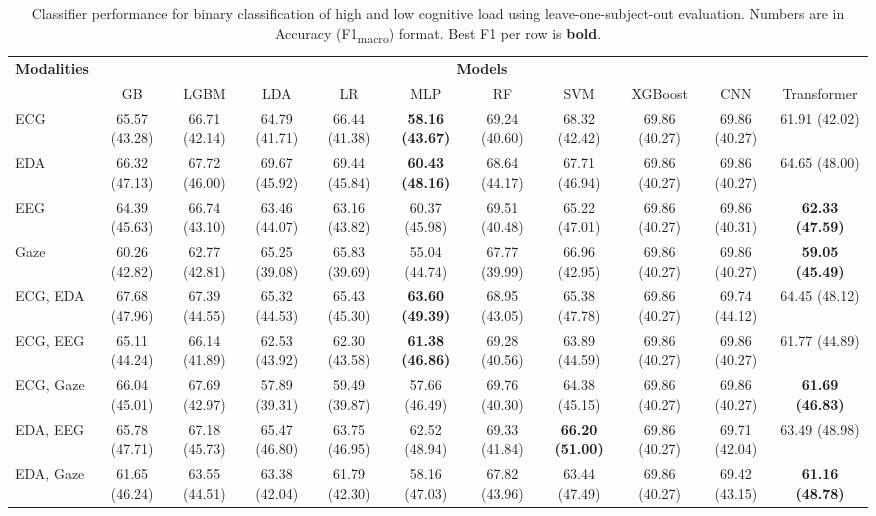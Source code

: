 \begin{table}[!htbp]
  \centering
  \scriptsize
  \setlength{\tabcolsep}{3pt}
  \caption{Classifier performance for binary classification of high and low cognitive load using leave-one-subject-out evaluation. Numbers are in Accuracy (F1\textsubscript{macro}) format. Best F1 per row is \textbf{bold}.}
  \label{tab:results_loso}
  \begin{tabular}{lcccccccccc}
    \toprule
    \textbf{Modalities} & \multicolumn{10}{c}{\textbf{Models}} \\
    \cmidrule(l){2-11}
    & GB & LGBM & LDA & LR & MLP & RF & SVM & XGBoost & CNN & Transformer \\
    \midrule
    ECG & 65.57 (43.28) & 66.71 (42.14) & 64.79 (41.71) & 66.44 (41.38) & \textbf{58.16 (43.67)} & 69.24 (40.60) & 68.32 (42.42) & 69.86 (40.27) & 69.86 (40.27) & 61.91 (42.02) \\
    EDA & 66.32 (47.13) & 67.72 (46.00) & 69.67 (45.92) & 69.44 (45.84) & \textbf{60.43 (48.16)} & 68.64 (44.17) & 67.71 (46.94) & 69.86 (40.27) & 69.86 (40.27) & 64.65 (48.00) \\
    EEG & 64.39 (45.63) & 66.74 (43.10) & 63.46 (44.07) & 63.16 (43.82) & 60.37 (45.98) & 69.51 (40.48) & 65.22 (47.01) & 69.86 (40.27) & 69.86 (40.31) & \textbf{62.33 (47.59)} \\
    Gaze & 60.26 (42.82) & 62.77 (42.81) & 65.25 (39.08) & 65.83 (39.69) & 55.04 (44.74) & 67.77 (39.99) & 66.96 (42.95) & 69.86 (40.27) & 69.86 (40.27) & \textbf{59.05 (45.49)} \\
    \midrule
    ECG, EDA & 67.68 (47.96) & 67.39 (44.55) & 65.32 (44.53) & 65.43 (45.30) & \textbf{63.60 (49.39)} & 68.95 (43.05) & 65.38 (47.78) & 69.86 (40.27) & 69.74 (44.12) & 64.45 (48.12) \\
    ECG, EEG & 65.11 (44.24) & 66.14 (41.89) & 62.53 (43.92) & 62.30 (43.58) & \textbf{61.38 (46.86)} & 69.28 (40.56) & 63.89 (44.59) & 69.86 (40.27) & 69.86 (40.27) & 61.77 (44.89) \\
    ECG, Gaze & 66.04 (45.01) & 67.69 (42.97) & 57.89 (39.31) & 59.49 (39.87) & 57.66 (46.49) & 69.76 (40.30) & 64.38 (45.15) & 69.86 (40.27) & 69.86 (40.27) & \textbf{61.69 (46.83)} \\
    EDA, EEG & 65.78 (47.71) & 67.18 (45.73) & 65.47 (46.80) & 63.75 (46.95) & 62.52 (48.94) & 69.33 (41.84) & \textbf{66.20 (51.00)} & 69.86 (40.27) & 69.71 (42.04) & 63.49 (48.98) \\
    EDA, Gaze & 61.65 (46.24) & 63.55 (44.51) & 63.38 (42.04) & 61.79 (42.30) & 58.16 (47.03) & 67.82 (43.96) & 63.44 (47.49) & 69.86 (40.27) & 69.42 (43.15) & \textbf{61.16 (48.78)} \\

\end{tabular}
\end{table}
